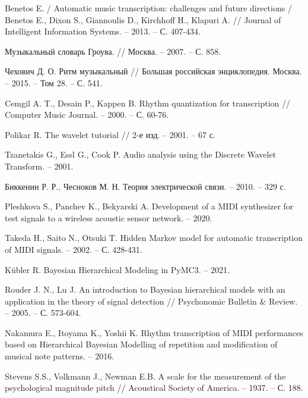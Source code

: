 
\begingroup
\renewcommand{\section}[2]{}
\begin{thebibliography}{}
	
Benetos E. / Automatic music transcription: challenges and future directions / Benetos E., Dixon S., Giannoulis D., Kirchhoff H., Klapuri A. // Journal of Intelligent Information Systems. -- 2013. -- С. 407-434.

Музыкальный словарь Гроува. // Москва. -- 2007. -- С. 858.

Чехович Д. О. Ритм музыкальный // Большая российская энциклопедия. Москва. -- 2015. -- Том 28. -- С. 541.

Cemgil A. T., Desain P., Kappen B. Rhythm quantization for transcription // Computer Music Journal. -- 2000. -- С. 60-76.

Polikar R. The wavelet tutorial // 2-е изд. -- 2001. -- 67 с.

Tzanetakis G., Essl G., Cook P. Audio analysis using the Discrete Wavelet Transform. -- 2001.

Биккенин Р. Р., Чесноков М. Н. Теория электрической связи. -- 2010. -- 329 с.

Pleshkova S., Panchev K., Bekyarski A. Development of a MIDI synthesizer for test signals to a wireless acoustic sensor network. -- 2020.

Takeda H., Saito N., Otsuki T. Hidden Markov model for automatic transcription of MIDI signals. -- 2002. -- С. 428-431.

Kübler R. Bayesian Hierarchical Modeling in PyMC3. -- 2021.

Rouder J. N., Lu J. An introduction to Bayesian hierarchical models with an application in the theory of signal detection // Psychonomic Bulletin \& Review. -- 2005. -- С. 573-604.

Nakamura E., Itoyama K., Yoshii K. Rhythm transcription of MIDI performances based on Hierarchical Bayesian Modelling of repetition and modification of musical note patterns. -- 2016.

Stevens S.S., Volkmann J., Newman E.B. A scale for the measurement of the psychological magnitude pitch // Acoustical Society of America. -- 1937. -- С. 188.


\end{thebibliography}
